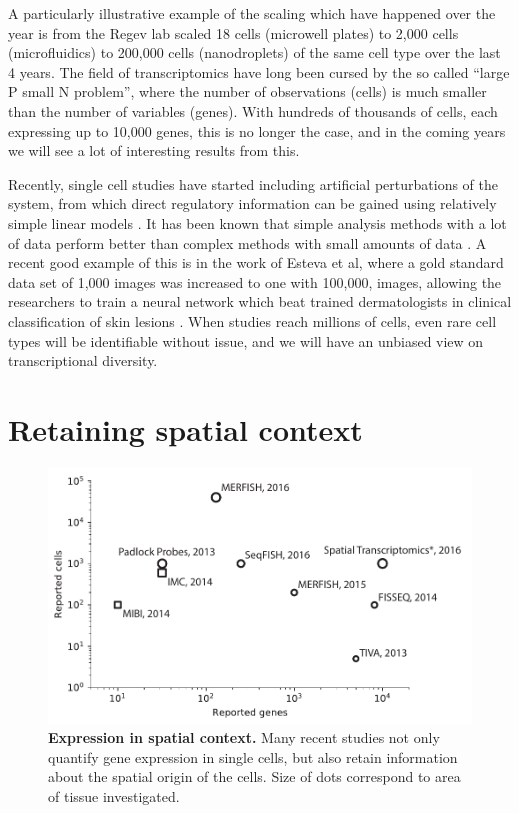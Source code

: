 A particularly illustrative example of the scaling which have happened over the year is from
the Regev lab scaled 18 cells \cite{Shalek2014-gu} (microwell plates) to 2,000 cells \cite{Shalek2014-gu} (microfluidics) to 200,000 cells \cite{Dixit2016-qx} (nanodroplets) of the same cell type over the last 4 years. The field of transcriptomics have long been cursed by the so called ``large P small N problem'', where the number of observations (cells) is much smaller than the number of variables (genes). With hundreds of thousands of cells, each expressing up to 10,000 genes, this is no longer the case, and in the coming years we will see a lot of interesting results from this.

Recently, single cell studies have started including artificial perturbations of the system, from
which direct regulatory information can be gained using relatively simple linear models \cite{Dixit2016-qx, Jaitin2016-sj, Adamson2016-mt, Datlinger2017-aa}. It has been known that simple analysis methods with a lot of data perform better than complex methods with small amounts of data \cite{Halevy2009-uj}. A recent good example of this is in the work of Esteva et al, where a gold standard data set of 1,000 images was increased to one with 100,000,
images, allowing the researchers to train a neural network which beat trained dermatologists
in clinical classification of skin lesions \cite{Esteva2017-cw}. When studies reach millions of cells, even rare cell
types will be identifiable without issue, and we will have an unbiased view on transcriptional diversity.

\section{Retaining spatial context}

\begin{figure}
    \centering
    \centerline{\includegraphics[width=.75\textwidth]{"SpatialTechnologies"}}
    \caption[Expression in spatial context]{\textbf{Expression in spatial context.} Many recent studies not only quantify gene expression in single cells, but also retain information about the spatial origin of the cells. Size of dots correspond to area of tissue investigated.}
    \label{fig:spatial}
\end{figure}

